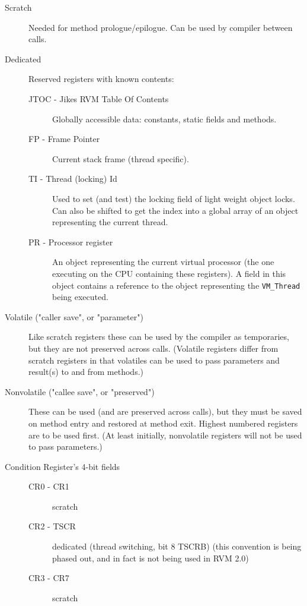 \begin{description}
\item [Scratch]
     Needed for method prologue/epilogue.  Can be used by compiler between
     calls.

\item[Dedicated]
     Reserved registers with known contents:
\begin{description}
\item [JTOC - Jikes RVM Table Of Contents]
        Globally accessible data: constants, static fields and methods.

\item [FP - Frame Pointer]
        Current stack frame (thread specific).

\item [TI - Thread (locking) Id]
        Used to set (and test) the locking field of light weight object
        locks.  Can also be shifted to get the index into a global
        array of an object representing the current thread.

\item [PR - Processor register]
        An object representing the current virtual processor (the one
        executing on the CPU containing these registers).  A field in
        this object contains a reference to the object representing
        the {\tt VM\_Thread} being executed.
\end{description}

\item [Volatile ("caller save", or "parameter")]
     Like scratch registers these can be used by the compiler as
     temporaries, but they are not preserved across calls.  (Volatile
     registers differ from scratch registers in that volatiles
     can be used to pass parameters and result(s) to and from
     methods.)

\item [Nonvolatile ("callee save", or "preserved")]
     These can be used (and are preserved across calls), but they must be
     saved on method entry and restored at method exit.  Highest numbered
     registers are to be used first.  (At least initially, nonvolatile
     registers will not be used to pass parameters.)

\item[Condition Register's 4-bit fields]
\begin{description}
\item    [CR0 - CR1] scratch

\item    [CR2 - TSCR] dedicated (thread switching, bit 8 TSCRB) (this
     convention is being phased out, and in fact is not being used in RVM 2.0)

\item    [CR3 - CR7] scratch
\end{description}
\end{description}


